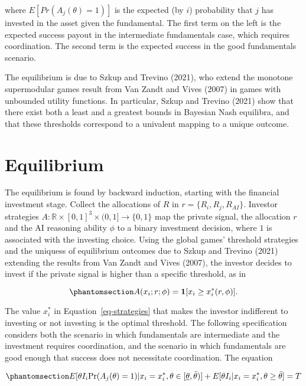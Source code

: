 \documentclass[
]{article}
\theoremstyle{definition}
\theoremstyle{plain}
\theoremstyle{remark}
\begin{document}
where \(E[Pr(A_j(\theta)=1)]\) is the expected (by \(i\)) probability
that \(j\) has invested in the asset given the fundamental. The first
term on the left is the expected success payout in the intermediate
fundamentals case, which requires coordination. The second term is the
expected success in the good fundamentals scenario.

The equilibrium is due to Szkup and Trevino (2021), who extend the
monotone supermodular games result from Van Zandt and Vives (2007) in
games with unbounded utility functions. In particular, Szkup and Trevino
(2021) show that there exist both a least and a greatest bounds in
Bayesian Nash equilibra, and that these thresholds correspond to a
univalent mapping to a unique outcome.

\section{Equilibrium}\label{equilibrium-1}

The equilibrium is found by backward induction, starting with the
financial investment stage. Collect the allocations of \(R\) in
\(r=\{R_i, R_j, R_{AI}\}\). Investor strategies
\(A : \mathbb{R} \times [0,1]^3 \times (0,1]\to \{0,1\}\) map the
private signal, the allocation \(r\) and the AI reasoning ability
\(\phi\) to a binary investment decision, where \(1\) is associated with
the investing choice. Using the global games' threshold strategies and
the uniquess of equilibrium outcomes due to Szkup and Trevino (2021)
extending the results from Van Zandt and Vives (2007), the investor
decides to invest if the private signal is higher than a specific
threshold, as in

\begin{equation}\phantomsection\label{eq-strategies}{
A(x_i;r;\phi) = \mathbf{1}[x_i \geq x_i^*(r, \phi)].
}\end{equation}

The value \(x_i^*\) in Equation~\ref{eq-strategies} that makes the
investor indifferent to investing or not investing is the optimal
threshold. The following specification considers both the scenario in
which fundamentals are intermediate and the investment requires
coordination, and the scenario in which fundamentals are good enough
that success does not necessitate coordination. The equation

\begin{equation}\phantomsection\label{eq-optimthresh}{
E[\theta I_i \text{Pr}(A_j(\theta) = 1)|x_i = x_i^*, \theta \in [\underline{\theta}, \bar{\theta})] + E[\theta I_i|x_i = x_i^*, \theta \geq \bar{\theta}] = T
}\end{equation}
\end{document}
